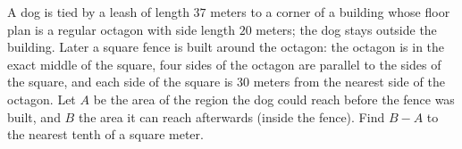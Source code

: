 A dog is tied by a leash of length $37$ meters to a corner of a building whose floor plan is a regular octagon with side length $20$ meters; the dog stays outside the building. Later a square fence is built around the octagon: the octagon is in the exact middle of the square, four sides of the octagon are parallel to the sides of the square, and each side of the square is $30$ meters from the nearest side of the octagon. Let $A$ be the area of the region the dog could reach before the fence was built, and $B$ the area it can reach afterwards (inside the fence). Find $B-A$ to the nearest tenth of a square meter.
